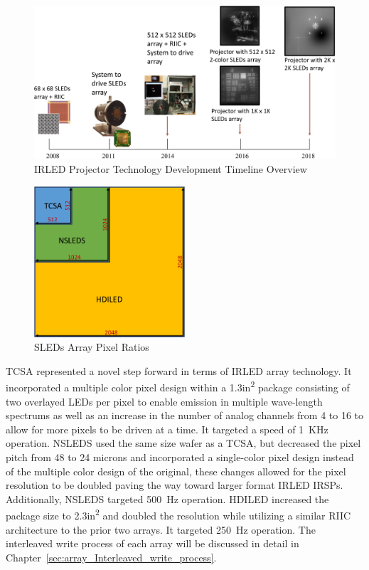 \begin{figure}
    \centering
    \includegraphics[width=1.0\textwidth]{fig/sleds_timeline.pdf}
    \caption{IRLED Projector Technology Development Timeline Overview}
    \label{fig:sleds_timeline}
\end{figure}

\begin{figure}
    \centering
    \includegraphics[width=0.5\textwidth]{fig/tcsa_nsleds_hdiled_array_ratio.pdf}
    \caption{SLEDs Array Pixel Ratios}
    \label{fig:tcsa_nsleds_hdiled_array_ratio}
\end{figure}

TCSA represented a novel step forward in terms of IRLED array technology. It incorporated a multiple color pixel design within a 1.3in\textsuperscript{2} package consisting of two overlayed LEDs per pixel to enable emission in multiple wave-length spectrums as well as an increase in the number of analog channels from 4 to 16 to allow for more pixels to be driven at a time. It targeted a speed of \mbox{1 KHz} operation. NSLEDS used the same size wafer as a TCSA, but decreased the pixel pitch from 48 to 24 microns and incorporated a single-color pixel design instead of the multiple color design of the original, these changes allowed for the pixel resolution to be doubled paving the way toward larger format IRLED IRSPs. Additionally, NSLEDS targeted \mbox{500 Hz} operation. HDILED increased the package size to 2.3in\textsuperscript{2} and doubled the resolution while utilizing a similar RIIC architecture to the prior two arrays. It targeted \mbox{250 Hz} operation. The interleaved write process of each array will be discussed in detail in Chapter~\ref{sec:array_Interleaved_write_process}.

